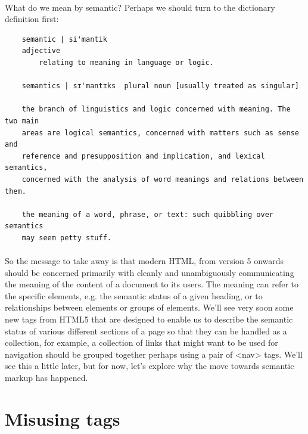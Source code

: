 \paragraph{} What do we mean by semantic? Perhaps we should turn to the dictionary definition first:
\begin{verbatim}
	semantic | si'mantik
	adjective 
		relating to meaning in language or logic. 

	semantics | sɪˈmantɪks 	plural noun [usually treated as singular] 

    the branch of linguistics and logic concerned with meaning. The two main
    areas are logical semantics, concerned with matters such as sense and 
    reference and presupposition and implication, and lexical semantics, 
    concerned with the analysis of word meanings and relations between them. 

    the meaning of a word, phrase, or text: such quibbling over semantics 
    may seem petty stuff. 
\end{verbatim}

\paragraph{} So the message to take away is that modern HTML, from version 5 onwards should be concerned primarily with cleanly and unambiguously communicating the meaning of the content of a document to its users. The meaning can refer to the specific elements, e.g. the semantic status of a given heading, or to relationships between elements or groups of elements. We'll see very soon some new tags from HTML5 that are designed to enable us to describe the semantic status of various different sections of a page so that they can be handled as a collection, for example, a collection of links that might want to be used for navigation should be grouped together perhaps using a pair of <nav> tags. We'll see this a little later, but for now, let's explore why the move towards semantic markup has happened.

\section{Misusing tags}
